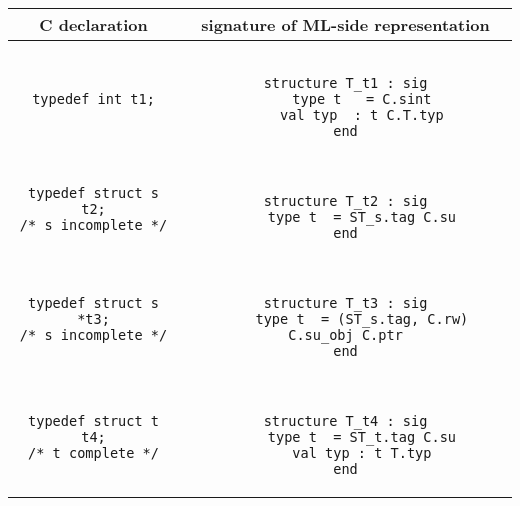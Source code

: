 \documentclass[titlepage,letterpaper]{article}
\begin{document}
\begin{small}
\begin{center}
\begin{tabular}{c|c}
C declaration & signature of ML-side representation \\ \hline\hline
\begin{minipage}{2in}
\begin{verbatim}
typedef int t1;
\end{verbatim}
\end{minipage}
&
\begin{minipage}{4in}
\begin{verbatim}

structure T_t1 : sig
    type t   = C.sint
    val typ  : t C.T.typ
end

\end{verbatim}
\end{minipage}
\\ \hline
\begin{minipage}{2in}
\begin{verbatim}
typedef struct s t2;
/* s incomplete */
\end{verbatim}
\end{minipage}
&
\begin{minipage}{4in}
\begin{verbatim}

structure T_t2 : sig
    type t  = ST_s.tag C.su
end

\end{verbatim}
\end{minipage}
\\ \hline
\begin{minipage}{2in}
\begin{verbatim}
typedef struct s *t3;
/* s incomplete */
\end{verbatim}
\end{minipage}
&
\begin{minipage}{4in}
\begin{verbatim}

structure T_t3 : sig
    type t  = (ST_s.tag, C.rw) C.su_obj C.ptr
end

\end{verbatim}
\end{minipage}
\\ \hline
\begin{minipage}{2in}
\begin{verbatim}
typedef struct t t4;
/* t complete */
\end{verbatim}
\end{minipage}
&
\begin{minipage}{4in}
\begin{verbatim}

structure T_t4 : sig
    type t  = ST_t.tag C.su
    val typ : t T.typ
end

\end{verbatim}
\end{minipage}
\end{tabular}
\end{center}
\end{small}
\end{document}
